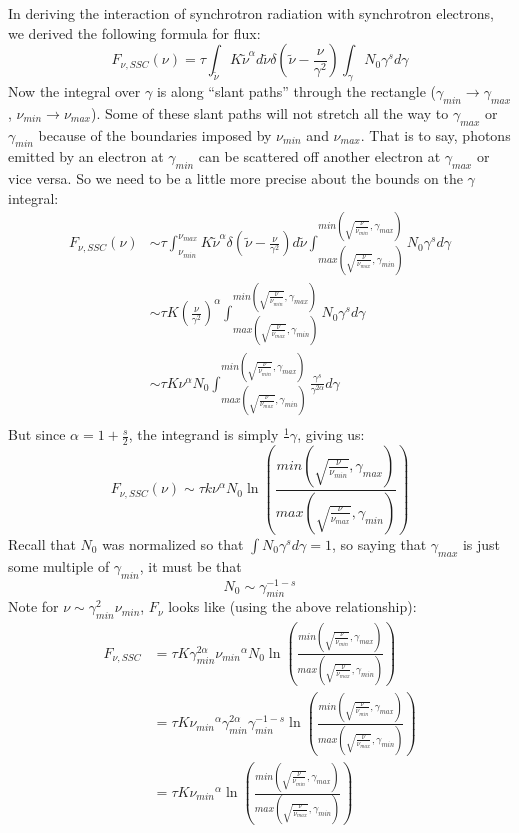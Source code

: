 \documentclass{article}
\def\inv#1{\frac1{#1}}
\def\inv#1{{\frac{1}{}#1}}
\def\tn{{\tilde\nu}}
\begin{document}
\def\numin{{\nu_{min}}}
\def\numax{{\nu_{max}}}
\def\gamin{\gamma_{min}}
\def\gamax{\gamma_{max}}
\def\gul{{min(\sqrt{\frac{\nu}{\numin}},\gamax)}}
\def\gll{{max(\sqrt{\frac{\nu}{\numax}},\gamin)}}
In deriving the interaction of synchrotron radiation with
synchrotron electrons, we derived the following formula for flux:
$$F_{\nu,SSC}(\nu)=\tau\int_{\tn}{K\tn^\alpha d\tn\delta\left(\tn-
\frac{\nu}{\gamma^2}\right)\int_\gamma{N_0\gamma^sd\gamma}}$$
Now the integral over $\gamma$ is along ``slant paths'' through
the rectangle ($\gamin\to\gamax$, $\numin\to\numax$).
Some of these slant paths will not stretch all the way to $\gamax$
or $\gamin$ because of the boundaries imposed by $\numin$ and
$\numax$.  That is to say, photons emitted by an electron at $\gamin$ can be scattered off another electron at $\gamax$ or vice versa. So we need to be a little more precise about the bounds
on the $\gamma$ integral:
$$\begin{aligned}F_{\nu,SSC}(\nu)
&\sim\tau\int_\numin^\numax{K\tn^\alpha\delta(\tn-\frac{\nu}{\gamma^2})d\tn
\int_\gll^\gul{N_0\gamma^sd\gamma}}\\ 
&\sim\tau K\left(\frac{\nu}{\gamma^2}\right)^\alpha
\int_\gll^\gul{N_0\gamma^sd\gamma}\\ 
&\sim\tau K\nu^\alpha N_0
\int_\gll^\gul{\frac{\gamma^s}{\gamma^{2\alpha}}d\gamma}\\ \end{aligned}$$
But since $\alpha={1+\frac{s}{2}}$, the integrand is simply $\inv{\gamma}$,
giving us:
$$\boxed{F_{\nu,SSC}(\nu)\sim\tau k\nu^\alpha N_0\ln\left(\frac{\gul}{\gll}\right)}$$
Recall that $N_0$ was normalized so that $\int{N_0\gamma^sd\gamma}=1$, so
saying that $\gamax$ is just some multiple of $\gamin$, it must be that
$$N_0\sim\gamin^{-1-s}$$
Note for $\nu\sim\gamin^2\numin$, $F_\nu$ looks like (using the above 
relationship):
\def\gllogul{\left(\frac{\gul}{\gll}\right)}
$$\begin{aligned}F_{\nu,SSC}&=\tau K\gamin^{2\alpha}\numin^\alpha N_0\ln\gllogul\\ 
&=\tau K\numin^\alpha\gamin^{2\alpha}\gamin^{-1-s}\ln\gllogul\\ 
&=\tau K \numin^\alpha\ln\gllogul\\ \end{aligned}$$

\def\gul{{min(\sqrt{\frac{\nu}{\numin}},\gamax)}}
\def\gll{{max(\sqrt{\frac{\nu}{\numax}},\gamin)}}
\end{document}
